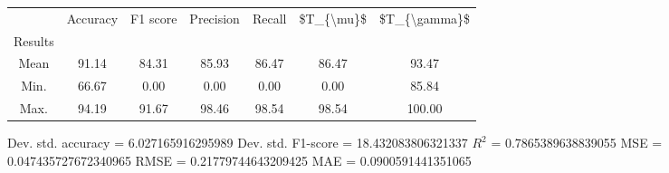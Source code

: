 \begin{tabular}{|c|c|c|c|c|c|c|}
\toprule
{} &  Accuracy &  F1 score &  Precision &  Recall &  \$T\_\{\textbackslash mu\}\$ &  \$T\_\{\textbackslash gamma\}\$ \\
Results &           &           &            &         &            &               \\
\hline
Mean    &     91.14 &     84.31 &      85.93 &   86.47 &      86.47 &         93.47 \\
Min.    &     66.67 &      0.00 &       0.00 &    0.00 &       0.00 &         85.84 \\
Max.    &     94.19 &     91.67 &      98.46 &   98.54 &      98.54 &        100.00 \\
\bottomrule
\end{tabular}

 Dev. std. accuracy = 6.027165916295989
 Dev. std. F1-score = 18.432083806321337
 $R^2$ = 0.7865389638839055
 MSE = 0.047435727672340965
 RMSE = 0.21779744643209425
 MAE = 0.0900591441351065